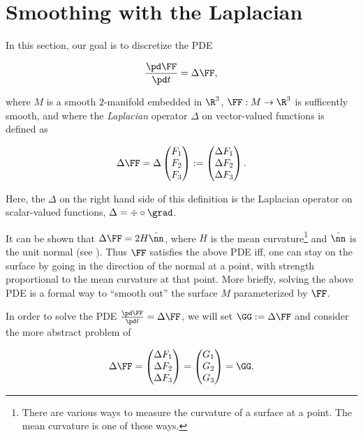 \newpage

\section{Smoothing with the Laplacian}

In this section, our goal is to discretize the PDE

\begin{align*}
    \frac{\pd \FF}{\pd t} = \Delta \FF,
\end{align*}

where $M$ is a smooth $2$-manifold embedded in $\R^3$, $\FF:M \rightarrow \R^3$ is sufficently smooth, and where the \textit{Laplacian} operator $\Delta$ on vector-valued functions is defined as

\begin{align*}
    \Delta \FF = \Delta \begin{pmatrix} F_1 \\ F_2 \\ F_3 \end{pmatrix} := \begin{pmatrix} \Delta F_1 \\ \Delta F_2 \\ \Delta F_3 \end{pmatrix}.
\end{align*}

Here, the $\Delta$ on the right hand side of this definition is the Laplacian operator on scalar-valued functions, $\Delta = \div \circ \grad$.

It can be shown that $\Delta \FF = 2H\hat{\nn}$, where $H$ is the mean curvature\footnote{There are various ways to measure the curvature of a surface at a point. The mean curvature is one of these ways.} and $\hat{\nn}$ is the unit normal (see \cite[p. 114]{book::DDG}). Thus $\FF$ satisfies the above PDE iff, one can stay on the surface by going in the direction of the normal at a point, with strength proportional to the mean curvature at that point. More briefly, solving the above PDE is a formal way to ``smooth out'' the surface $M$ parameterized by $\FF$.

In order to solve the PDE $\frac{\pd \FF}{\pd t} = \Delta \FF$, we will set $\GG := \Delta \FF$ and consider the more abstract problem of

\begin{align*}
    \Delta \FF
    =
    \begin{pmatrix} \Delta F_1 \\ \Delta F_2 \\ \Delta F_3 \end{pmatrix}
    =
    \begin{pmatrix} G_1 \\ G_2 \\ G_3 \end{pmatrix}
    =
    \GG.
\end{align*}

